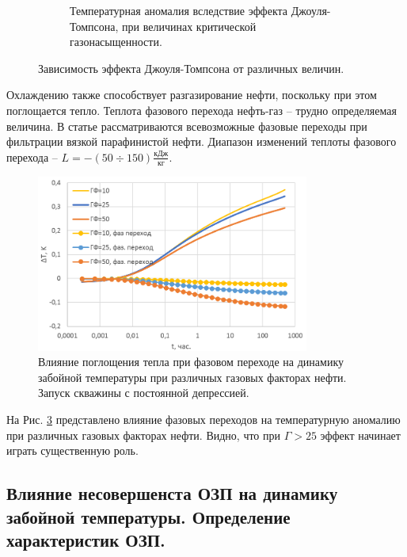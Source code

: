 \begin{figure}[H]
\begin{subfigure}[b]{0.5\textwidth}
		\caption{Температурная аномалия вследствие эффекта Джоуля-Томпсона, при величинах критической газонасыщенности.}
		\label{pic:critical_gas}
	\end{subfigure}
	\caption{Зависимость эффекта Джоуля-Томпсона от различных величин.}
	\label{pic:jt_curves}
\end{figure}

	Охлаждению также способствует разгазирование нефти, поскольку при этом поглощается тепло.
	Теплота фазового перехода нефть-газ -- трудно определяемая величина. 
	В статье \cite{shara} рассматриваются всевозможные фазовые переходы при фильтрации вязкой парафинистой нефти.
	Диапазон изменений теплоты фазового перехода -- $L = -(50\div150) \frac{\text{кДж}}{\text{кг}}$.
\begin{figure}[H]
	\centerline{\includegraphics[width=0.8\textwidth]{pic/phase_trans.png}}
	\caption{Влияние поглощения тепла при фазовом переходе на динамику забойной температуры при различных газовых факторах нефти. Запуск скважины с постоянной депрессией.}
	\label{pic:phase_trans}
\end{figure}
	На Рис. \ref{pic:phase_trans} представлено влияние фазовых переходов на температурную аномалию при различных газовых факторах нефти. Видно, что при $\Gamma > 25$ эффект начинает играть существенную роль.

\subsection{Влияние несовершенста ОЗП на динамику забойной температуры. Определение характеристик ОЗП.}
	
